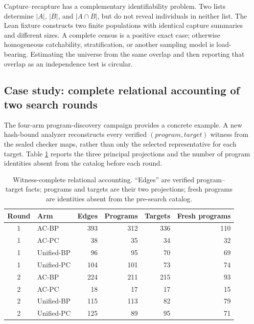 \documentclass[11pt,openany]{report}
\begin{document}
Capture--recapture has a complementary identifiability problem.  Two lists
determine $|A|$, $|B|$, and $|A\cap B|$, but do not reveal individuals in
neither list.  The Lean fixture
 constructs two finite
populations with identical capture summaries and different sizes.  A complete
census is a positive exact case; otherwise homogeneous catchability,
stratification, or another sampling model is load-bearing.  Estimating the
universe from the same overlap and then reporting that overlap as an
independence test is circular.

\subsection{Case study: complete relational accounting of two search rounds}

The four-arm program-discovery campaign provides a concrete example.  A new
hash-bound analyzer reconstructs every verified
$(\mathit{program},\mathit{target})$ witness from the sealed checker maps,
rather than only the selected representative for each target.  Table
\ref{tab:relational-rounds12} reports the three principal projections and the
number of program identities absent from the catalog before each round.

\begin{table}[htbp]
\centering
\caption{Witness-complete relational accounting.  ``Edges'' are verified
program--target facts; programs and targets are their two projections; fresh
programs are identities absent from the pre-search catalog.}
\label{tab:relational-rounds12}
\small
\begin{tabular}{clrrrr}
\toprule
Round & Arm & Edges & Programs & Targets & Fresh programs \\
\midrule
1 & AC-BP       & 393 & 312 & 336 & 110 \\
1 & AC-PC       &  38 &  35 &  34 &  32 \\
1 & Unified-BP  &  96 &  95 &  70 &  69 \\
1 & Unified-PC  & 104 & 101 &  73 &  74 \\
\midrule
2 & AC-BP       & 224 & 211 & 215 &  93 \\
2 & AC-PC       &  18 &  17 &  17 &  15 \\
2 & Unified-BP  & 115 & 113 &  82 &  79 \\
2 & Unified-PC  & 125 &  89 &  95 &  71 \\
\bottomrule
\end{tabular}
\end{table}
\end{document}
